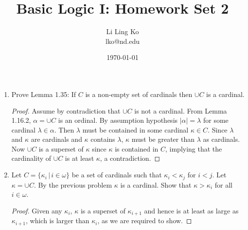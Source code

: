 \documentclass{article}
\begin{document}
\title{Basic Logic I: Homework Set 2}
\author{Li Ling Ko\\ lko@nd.edu}
\date{\today}
\maketitle

\begin{enumerate}
  \item Prove Lemma 1.35: If $C$ is a non-empty set of cardinals then
    $\cup C$ is a cardinal.

    \begin{proof}
      Assume by contradiction that $\cup C$ is not a cardinal. 
      From Lemma 1.16.2, $\alpha=\cup C$ is an ordinal. By assumption
      hypothesis $|\alpha|=\lambda$ for some cardinal $\lambda\in\alpha$.
      Then $\lambda$ must be contained in some cardinal $\kappa\in C$.
      Since $\lambda$ and $\kappa$ are cardinals and $\kappa$ contains
      $\lambda$, $\kappa$ must be greater than $\lambda$ as cardinals. Now
      $\cup C$ is a superset of $\kappa$ since $\kappa$ is contained in
      $C$, implying that the cardinality of $\cup C$ is at least $\kappa$,
      a contradiction.
    \end{proof}

  \item Let $C=\{\kappa_i\,|\, i\in\omega\}$ be a set of cardinals such
    that $\kappa_i<\kappa_j$ for $i<j$. Let $\kappa=\cup C$. By the
    previous problem $\kappa$ is a cardinal. Show that $\kappa>\kappa_i$
    for all $i\in\omega$.

    \begin{proof}
      Given any $\kappa_i$, $\kappa$ is a superset of $\kappa_{i+1}$ and
      hence is at least as large as $\kappa_{i+1}$, which is larger than
      $\kappa_i$, as we are required to show.
    \end{proof}
\end{enumerate}
\end{document}
